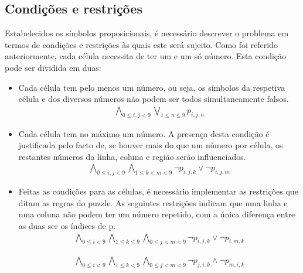 \documentclass[a4paper,12pt]{article}
\theoremstyle{definition}
\theoremstyle{theorem}
\theoremstyle{remark}
\begin{document}
\subsection{Condições e restrições}
Estabelecidos os símbolos proposicionais, é necessário descrever o problema em
termos de condições e restrições às quais este será sujeito.  Como foi referido
anteriormente, cada célula necessita de ter um e um só número. Esta condição
pode ser dividida em duas:
\begin{itemize}
     \item Cada célula tem pelo menos um número, ou seja, os símbolos da
        respetiva célula e dos diversos números não podem ser todos
        simultaneamente falsos.
        \begin{align}
        \bigwedge_{0\leq i,j < 9}
           \bigvee_{1\leq n \leq 9} p_{i,j,n}
        \end{align}
     
      \item Cada célula tem no máximo um número. A presença desta condição é
        justificada pelo facto de, se houver mais do que um número por célula,
        os restantes números da linha, coluna e região serão influenciados.
        \begin{align}
        \bigwedge_{0\leq i,j < 9}
           \bigwedge_{1\leq k < m < 9}
           {\lnot p_{i,j,k} \lor \lnot p_{i,j,m}}
        \end{align}

      \item Feitas as condições para as células, é necessário implementar as
         restrições que ditam as regras do puzzle.  As seguintes restrições
         indicam que uma linha e uma coluna não podem ter um número repetido,
         com a única diferença entre as duas ser os índices de p.
         \begin{align}
         \bigwedge_{0\leq i < 9} \bigwedge_{1\leq k \leq 9} \bigwedge_{0\leq j < m
         < 9} \lnot p_{i,j,k}
         \lor \lnot p_{i,m,k}
         \end{align}

         \begin{align}
         \bigwedge_{0\leq i < 9} \bigwedge_{1\leq k < 9} 
            \bigwedge_{0\leq j < m < 9}
               \lnot p_{j,i,k} \land \lnot p_{m,i,k}
         \end{align}
         

\end{itemize}
\end{document}
